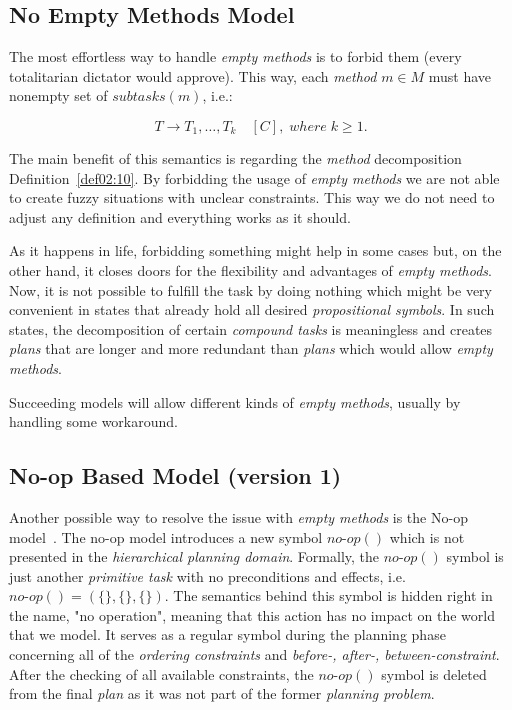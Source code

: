 \subsection{No Empty Methods Model}\label{sub03:311}

\medskip\noindent
The most effortless way to handle \emph{empty methods} is to forbid them (every totalitarian dictator would approve). This way, each \emph{method} $m \in M$ must have nonempty set of $subtasks(m)$, i.e.:

\[
    T \rightarrow T_1,\dots,T_k \quad [C], \; where \; k \geq 1.
\]

\noindent
The main benefit of this semantics is regarding the \emph{method} decomposition Definition~\ref{def02:10}. By forbidding the usage of \emph{empty methods} we are not able to create fuzzy situations with unclear constraints. This way we do not need to adjust any definition and everything works as it should.

\medskip\noindent
As it happens in life, forbidding something might help in some cases but, on the other hand, it closes doors for the flexibility and advantages of \emph{empty methods}. Now, it is not possible to fulfill the task by doing nothing which might be very convenient in states that already hold all desired \emph{propositional symbols}. In such states, the decomposition of certain \emph{compound tasks} is meaningless and creates \emph{plans} that are longer and more redundant than \emph{plans} which would allow \emph{empty methods}.

\medskip\noindent
Succeeding models will allow different kinds of \emph{empty methods}, usually by handling some workaround.

\subsection{No-op Based Model (version 1)}

\medskip\noindent
Another possible way to resolve the issue with \emph{empty methods} is the No-op model~\cite{ondrckova2023semantics}. The no-op model introduces a new symbol $no\text{-}op()$ which is not presented in the \emph{hierarchical planning domain}. Formally, the $no\text{-}op()$ symbol is just another \emph{primitive task} with no preconditions and effects, i.e. $no\text{-}op() = (\{\}, \{\}, \{\})$. The semantics behind this symbol is hidden right in the name, "no operation", meaning that this action has no impact on the world that we model. It serves as a regular symbol during the planning phase concerning all of the \emph{ordering constraints} and \emph{before-, after-, between-constraint}. After the checking of all available constraints, the $no\text{-}op()$ symbol is deleted from the final \emph{plan} as it was not part of the former \emph{planning problem}.

